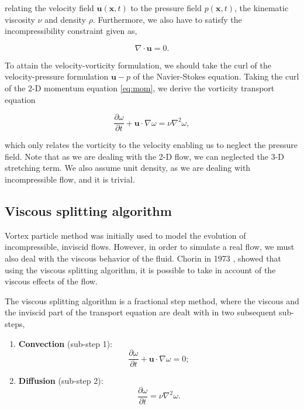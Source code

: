 relating the velocity field $\mathbf{u}\left(\mathbf{x},t\right)$ to the pressure field $p\left(\mathbf{x},t\right)$, the kinematic viscosity $\nu$ and density $\rho$. Furthermore, we also have to satisfy the incompressibility constraint given as, 

	\begin{equation}
	\nabla\cdot\mathbf{u} = 0.
	\end{equation}

To attain the velocity-vorticity formulation, we should take the curl of the velocity-pressure formulation $\mathbf{u}-p$ of the Navier-Stokes equation. Taking the curl of the 2-D momentum equation \ref{eq:mom}, we derive the vorticity transport equation

	\begin{equation}
	\frac{\partial \omega}{\partial t} + \mathbf{u}\cdot\nabla\omega = \nu \nabla^2 \omega,
	\end{equation}

which only relates the vorticity to the velocity enabling us to neglect the pressure field. Note that as we are dealing with the 2-D flow, we can neglected the 3-D stretching term. We also assume unit density, as we are dealing with incompressible flow, and it is trivial.

\subsection{Viscous splitting algorithm}
Vortex particle method was initially used to model the evolution of incompressible, inviscid flows. However, in order to simulate a real flow, we must also deal with the viscous behavior of the fluid. Chorin in 1973 \cite{Chorin1973}, showed that using the viscous splitting algorithm, it is possible to take in account of the viscous effects of the flow. 

The viscous splitting algorithm is a fractional step method, where the viscous and the inviscid part of the transport equation are dealt with in two subsequent sub-steps, 

	\begin{enumerate}
	\item \textbf{Convection} (sub-step 1):
		\begin{equation}
		\frac{\partial\omega}{\partial t} + \mathbf{u}\cdot\nabla\omega=0;
		\label{eq:convectionEulerian}
		\end{equation}
		
	\item \textbf{Diffusion} (sub-step 2):
		\begin{equation}
		\frac{\partial\omega}{\partial t} = \nu\nabla^2\omega.
		\label{eq:vsa2}
		\end{equation}
	
	\end{enumerate}

